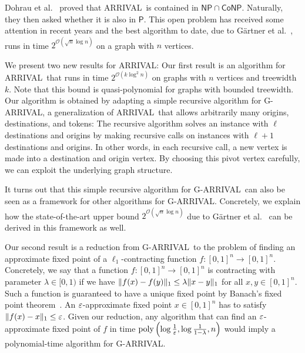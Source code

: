 \documentclass[a4paper,UKenglish,cleveref, autoref, thm-restate]{lipics-v2021}
\newcommand{\NP}{\mathsf{NP}}
\newcommand{\CoNP}{\mathsf{CoNP}}
\renewcommand{\P}{\mathsf{P}}
\newcommand{\bigO}{\mathcal{O}}
\DeclareMathOperator{\poly}{poly}
\DeclarePairedDelimiter\norm{\lVert}{\rVert}
\renewcommand{\epsilon}{\ensuremath\varepsilon}
\newcommand{\problem}[1]{\textrm{#1}}
\newcommand{\arrival}{\problem{ARRIVAL}}
\newcommand{\garrival}{\problem{G-ARRIVAL}}
\begin{document}
Dohrau et al.\@~\cite{dohrauARRIVALZeroPlayerGraph2017} proved that \arrival\ is contained in $\NP \cap \CoNP$. Naturally, they then asked whether it is also in $\P$. This open problem has received some attention in recent years and the best algorithm to date, due to Gärtner et al.\@~\cite{gartnerSubexponentialAlgorithmARRIVAL2021}, runs in time $2^{\bigO(\sqrt{n} \log n)}$ on a graph with $n$ vertices.

We present two new results for \arrival: Our first result is an algorithm for \arrival\ that runs in time $2^{\bigO \left(k \log^2 n \right)}$ on graphs with $n$ vertices and treewidth $k$. Note that this bound is quasi-polynomial for graphs with bounded treewidth. Our algorithm is obtained by adapting a simple recursive algorithm for \garrival, a generalization of \arrival\ that allows arbitrarily many origins, destinations, and tokens: The recursive algorithm solves an instance with $\ell$ destinations and origins by making recursive calls on instances with $\ell + 1$ destinations and origins. In other words, in each recursive call, a new vertex is made into a destination and origin vertex. By choosing this pivot vertex carefully, we can exploit the underlying graph structure.

It turns out that this simple recursive algorithm for \garrival\ can also be seen as a framework for other algorithms for \garrival. Concretely, we explain how the state-of-the-art upper bound $2^{\bigO(\sqrt{n}\log n)}$ due to Gärtner et al.\@~\cite{gartnerSubexponentialAlgorithmARRIVAL2021} can be derived in this framework as well.

Our second result is a reduction from \garrival\ to the problem of finding an approximate fixed point of a $\ell_1$-contracting function $f : [0 ,1]^n \rightarrow [0 ,1]^n$. Concretely, we say that a function $f : [0 ,1]^n \rightarrow [0 ,1]^n$ is contracting with parameter $\lambda \in [0, 1)$ if we have $\norm{f(x) - f(y)}_1 \leq \lambda \norm{x - y}_1$ for all $x, y \in [0, 1]^n$. Such a function is guaranteed to have a unique fixed point by Banach's fixed point theorem~\cite{banach1922operations}. An $\epsilon$-approximate fixed point $x \in [0, 1]^n$ has to satisfy $\norm{f(x) - x}_1 \leq \epsilon$. Given our reduction, any algorithm that can find an $\epsilon$-approximate fixed point of $f$ in time $\poly \left(\log \frac{1}{\epsilon}, \log \frac{1}{1 - \lambda}, n \right)$ would imply a polynomial-time algorithm for \garrival.
\end{document}
